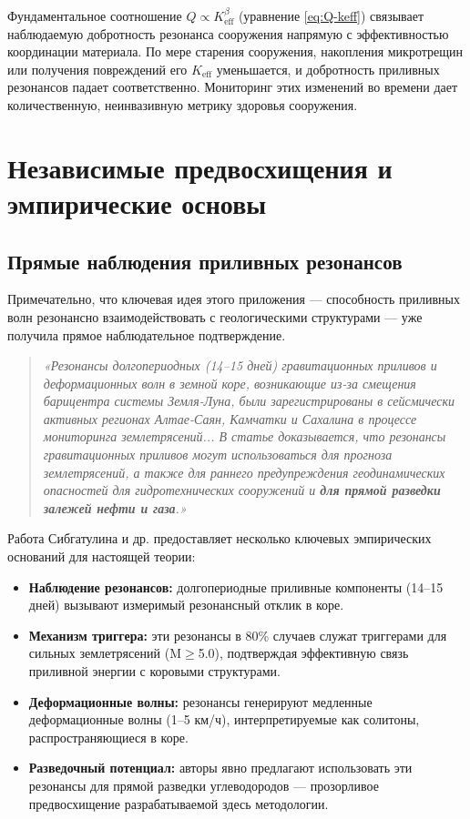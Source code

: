\documentclass[12pt,a4paper]{article}
\theoremstyle{remark}
\begin{document}
	Фундаментальное соотношение \(Q \propto K_{\mathrm{eff}}^{\beta}\) (уравнение \ref{eq:Q-keff}) связывает наблюдаемую добротность резонанса сооружения напрямую с эффективностью координации материала. По мере старения сооружения, накопления микротрещин или получения повреждений его \(K_{\mathrm{eff}}\) уменьшается, и добротность приливных резонансов падает соответственно. Мониторинг этих изменений во времени дает количественную, неинвазивную метрику здоровья сооружения.
	
	\section{Независимые предвосхищения и эмпирические основы}
	\label{sec:prior}
	
	\subsection{Прямые наблюдения приливных резонансов}
	
	Примечательно, что ключевая идея этого приложения — способность приливных волн резонансно взаимодействовать с геологическими структурами — уже получила прямое наблюдательное подтверждение.
	
	\begin{quotation}
		\noindent
		\textit{«Резонансы долгопериодных (14–15 дней) гравитационных приливов и деформационных волн в земной коре, возникающие из-за смещения барицентра системы Земля-Луна, были зарегистрированы в сейсмически активных регионах Алтае-Саян, Камчатки и Сахалина в процессе мониторинга землетрясений... В статье доказывается, что резонансы гравитационных приливов могут использоваться для прогноза землетрясений, а также для раннего предупреждения геодинамических опасностей для гидротехнических сооружений и \textbf{для прямой разведки залежей нефти и газа}.»} \cite{Sibgatulin2014}
	\end{quotation}
	
	Работа Сибгатулина и др. \cite{Sibgatulin2014} предоставляет несколько ключевых эмпирических оснований для настоящей теории:
	
	\begin{itemize}
		\item \textbf{Наблюдение резонансов:} долгопериодные приливные компоненты (14–15 дней) вызывают измеримый резонансный отклик в коре.
		\item \textbf{Механизм триггера:} эти резонансы в 80\% случаев служат триггерами для сильных землетрясений (M$\ge$5.0), подтверждая эффективную связь приливной энергии с коровыми структурами.
		\item \textbf{Деформационные волны:} резонансы генерируют медленные деформационные волны (1–5 км/ч), интерпретируемые как солитоны, распространяющиеся в коре.
		\item \textbf{Разведочный потенциал:} авторы явно предлагают использовать эти резонансы для прямой разведки углеводородов — прозорливое предвосхищение разрабатываемой здесь методологии.
	\end{itemize}
	
\end{document}
